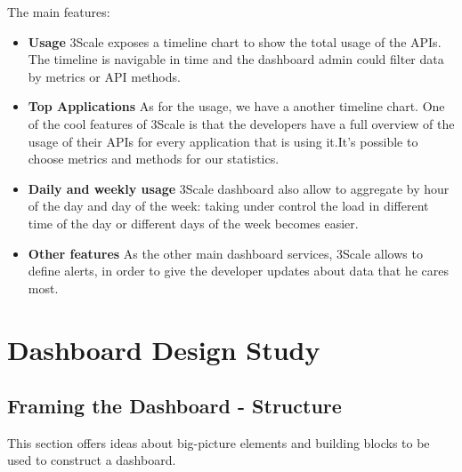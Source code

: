 \documentclass[a4paper,13pt]{report}
\begin{document}
The main features:
\begin{itemize}
\item \textbf{Usage}\newline
 3Scale exposes a timeline chart to show the total usage of the APIs. The timeline is navigable in time and the dashboard admin could filter data by  metrics or API methods.

\item  \textbf{Top Applications}\newline
As for the usage, we have a another timeline chart. One of the cool features of 3Scale is that the developers have a full overview of the usage of their APIs for every application that is using it.It's possible to choose metrics and methods for our statistics.

\item \textbf{Daily and weekly usage}\newline
 3Scale dashboard also allow to aggregate by hour of the day and day of the week: taking under control the load in different time of the day or different days of the week becomes easier.


\item \textbf{Other features}\newline
As the other main dashboard services, 3Scale allows to define alerts, in order to give the developer updates about data that he cares most.
\end{itemize}

\chapter{Dashboard Design Study}
\section{Framing the Dashboard - Structure}
This section offers ideas about big-picture elements and building blocks to be used to construct a dashboard. \newline 
\end{document}
